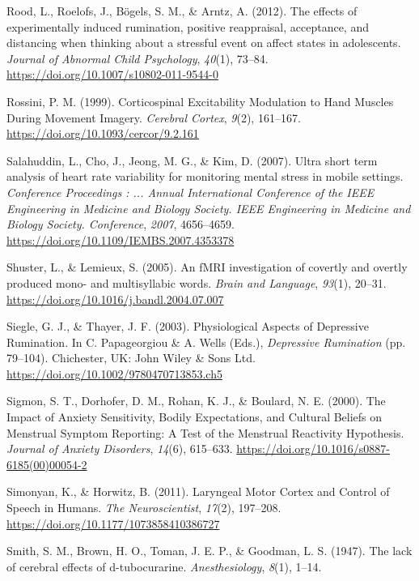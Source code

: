 \documentclass[a4paper,12pt,twoside,openright,oldfontcommands]{memoir}
\begin{document}
\hypertarget{ref-Rood2012}{}
Rood, L., Roelofs, J., Bögels, S. M., \& Arntz, A. (2012). The effects
of experimentally induced rumination, positive reappraisal, acceptance,
and distancing when thinking about a stressful event on affect states in
adolescents. \emph{Journal of Abnormal Child Psychology}, \emph{40}(1),
73--84. \url{https://doi.org/10.1007/s10802-011-9544-0}

\hypertarget{ref-rossini_corticospinal_1999}{}
Rossini, P. M. (1999). Corticospinal Excitability Modulation to Hand
Muscles During Movement Imagery. \emph{Cerebral Cortex}, \emph{9}(2),
161--167. \url{https://doi.org/10.1093/cercor/9.2.161}

\hypertarget{ref-Salahuddin2007}{}
Salahuddin, L., Cho, J., Jeong, M. G., \& Kim, D. (2007). Ultra short
term analysis of heart rate variability for monitoring mental stress in
mobile settings. \emph{Conference Proceedings : ... Annual International
Conference of the IEEE Engineering in Medicine and Biology Society. IEEE
Engineering in Medicine and Biology Society. Conference}, \emph{2007},
4656--4659. \url{https://doi.org/10.1109/IEMBS.2007.4353378}

\hypertarget{ref-shuster_fmri_2005}{}
Shuster, L., \& Lemieux, S. (2005). An fMRI investigation of covertly
and overtly produced mono- and multisyllabic words. \emph{Brain and
Language}, \emph{93}(1), 20--31.
\url{https://doi.org/10.1016/j.bandl.2004.07.007}

\hypertarget{ref-papageorgiou_physiological_2003}{}
Siegle, G. J., \& Thayer, J. F. (2003). Physiological Aspects of
Depressive Rumination. In C. Papageorgiou \& A. Wells (Eds.),
\emph{Depressive Rumination} (pp. 79--104). Chichester, UK: John Wiley
\& Sons Ltd. \url{https://doi.org/10.1002/9780470713853.ch5}

\hypertarget{ref-sigmon_impact_2000}{}
Sigmon, S. T., Dorhofer, D. M., Rohan, K. J., \& Boulard, N. E. (2000).
The Impact of Anxiety Sensitivity, Bodily Expectations, and Cultural
Beliefs on Menstrual Symptom Reporting: A Test of the Menstrual
Reactivity Hypothesis. \emph{Journal of Anxiety Disorders},
\emph{14}(6), 615--633.
\url{https://doi.org/10.1016/s0887-6185(00)00054-2}

\hypertarget{ref-simonyan_laryngeal_2011}{}
Simonyan, K., \& Horwitz, B. (2011). Laryngeal Motor Cortex and Control
of Speech in Humans. \emph{The Neuroscientist}, \emph{17}(2), 197--208.
\url{https://doi.org/10.1177/1073858410386727}

\hypertarget{ref-smith_lack_1947}{}
Smith, S. M., Brown, H. O., Toman, J. E. P., \& Goodman, L. S. (1947).
The lack of cerebral effects of d-tubocurarine. \emph{Anesthesiology},
\emph{8}(1), 1--14.
\end{document}
